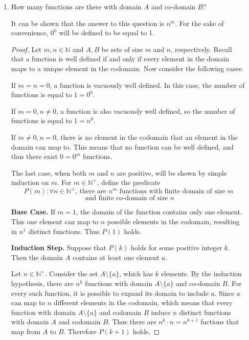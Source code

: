 \documentclass[11pt]{article}
\begin{document}
    \begin{enumerate}[label=\alph*)]
        \item How many functions are there with domain \(A\) and co-domain \(B\)? 
        
        It can be shown that the answer to this question is \(n^m\). For the sake of convenience, \(0^0\) will be defined to be equal to 1.
        \begin{proof}
            Let \(m,n \in \mathbb{N}\) and \(A,B\) be sets of size \(m\) and \(n\), respectively. Recall that a function is well defined if and only if every element in the domain maps to a unique element in the codomain. Now consider the following cases:

            If \(m=n=0\), a function is vacuously well defined. In this case, the number of functions is equal to \(1=0^0\).

            If \(m=0, n\neq 0\), a function is also vacuously well defined, so the number of functions is equal to \(1=n^0\).

            If \(m\neq 0, n=0\), there is no element in the codomain that an element in the domain can map to. This means that no function can be well defined, and thus there exist \(0 = 0^m\) functions.

            The last case, when both \(m\) and \(n\) are positive, will be shown by simple induction on \(m\).
            For \(m \in \mathbb{N}^+\), define the predicate
            \[
                P(m) \colon \forall n \in \mathbb{N}^+ \text{, there are } n^m \text{ functions with finite domain of size } m
            \]
            \[
                \text{ and finite co-domain of size } n
            \]

            \textbf{Base Case.} If \(m = 1\), the domain of the function contains only one element. This one element can map to \(n\) possible elements in the codomain, resulting in \(n^1\) distinct functions. Thus \(P(1)\) holds.

            \textbf{Induction Step.} Suppose that \(P(k)\) holds for some positive integer \(k\). Then the domain \(A\) contains at least one element \(a\).
            
            Let \(n \in \mathbb{N}^+\). Consider the set \(A\setminus\{a\}\), which has \(k\) elements. By the induction hypothesis, there are \(n^k\) functions with domain \(A\setminus\{a\}\) and co-domain \(B\). For every such function, it is possible to expand its domain to include \(a\). Since \(a\) can map to \(n\) different elements in the codomain, which means that every function with domain \(A \setminus \{a\}\) and codomain \(B\) induce \(n\) distinct functions with domain \(A\) and codomain \(B\). Thus there are \(n^k \cdot n = n^{k+1} \) fuctions that map from \(A\) to \(B\). Therefore \(P(k+1)\) holds.


\end{proof}
\end{enumerate}
\end{document}
